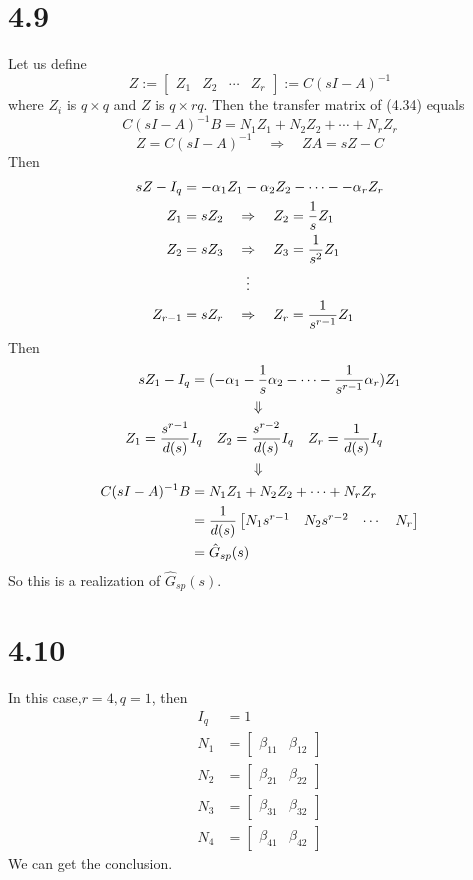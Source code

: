 \documentclass{article}
\begin{document}
\section*{4.9}
Let us define
\[Z:=\begin{bmatrix}Z_{1}&Z_{2}&\cdots&Z_{r}\end{bmatrix}:=C(sI-A)^{-1}\]
where $Z_{i}$ is $q\times q$ and $Z$ is $q\times rq$. Then the transfer matrix of (4.34) equals
\[C(sI-A)^{-1}B=N_{1}Z_{1}+N_{2}Z_{2}+\cdots +N_{r}Z_{r}\] 
\[Z=C(sI-A)^{-1}\quad \Rightarrow \quad ZA=sZ-C\]
Then
$$
\begin{aligned}
sZ-I_{q}&=-\alpha_{1}Z_{1}-\alpha_{2}Z_{2}-\cdots--\alpha_{r}Z_{r}\\
Z_{1}&=sZ_{2} \quad \Rightarrow \quad Z_{2}=\frac{1}{s}Z_{1}\\
Z_{2}&=sZ_{3} \quad \Rightarrow \quad Z_{3}=\frac{1}{s^{2}}Z_{1}\\
&\hspace{1.6cm} \vdots\\
Z_{r-1}&=sZ_{r} \quad \Rightarrow \quad Z_{r}=\frac{1}{s^{r-1}}Z_{1}
\end{aligned}
$$
Then
$$
\begin{aligned}
sZ_{1}-I_{q}&=(-\alpha_{1}-\frac{1}{s}\alpha_{2}-\cdots -\frac{1}{s^{r-1}}\alpha_{r})Z_{1}\\
&\hspace{1.5cm} \Downarrow\\
Z_{1}=\frac{s^{r-1}}{d(s)}&I_{q} \quad Z_{2}=\frac{s^{r-2}}{d(s)}I_{q} \quad
Z_{r}=\frac{1}{d(s)}I_{q} \\
&\hspace{1.5cm} \Downarrow\\
C(sI-A)^{-1}B&=N_{1}Z_{1}+N_{2}Z_{2}+\cdots +N_{r}Z_{r}\\
&=\frac{1}{d(s)}
\begin{bmatrix}N_{1}s^{r-1}&N_{2}s^{r-2}&\cdots&N_{r}\end{bmatrix}\\
&=\hat{G}_{sp}(s)
\end{aligned} 
$$
So this is a realization of $\hat{G}_{sp}(s)$.
\section*{4.10}
In this case,$r=4,q=1$, then
$$
\begin{aligned}
I_{q}&=1\\
N_{1}&=\begin{bmatrix}\beta_{11} &\beta_{12}\end{bmatrix}\\
N_{2}&=\begin{bmatrix}\beta_{21} &\beta_{22}\end{bmatrix}\\
N_{3}&=\begin{bmatrix}\beta_{31} &\beta_{32}\end{bmatrix}\\
N_{4}&=\begin{bmatrix}\beta_{41} &\beta_{42}\end{bmatrix}\end{aligned}
$$
We can get the conclusion.
\end{document}
